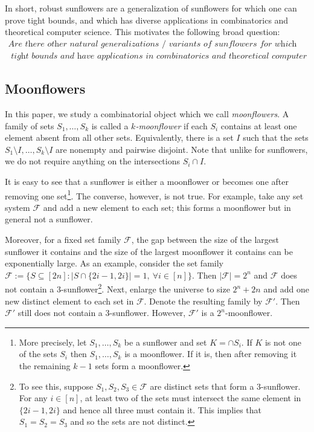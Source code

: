 \documentclass{article}
\newcommand{\<}{\langle}
\renewcommand{\>}{\rangle}
\newcommand{\calF}{\mathcal{F}}
\begin{document}
In short, robust sunflowers are a generalization of sunflowers for which one can prove tight bounds, and which has diverse applications in combinatorics and theoretical computer science. This motivates the following broad question:
\[
\begin{array}{c} %
\textit{Are there other natural generalizations / variants of sunflowers for which we are able to prove} \\
\textit{ tight bounds and have applications in combinatorics and theoretical computer science?}
\end{array}
\]

\subsection{Moonflowers}
In this paper, we study a combinatorial object which we call \emph{moonflowers}. A family of sets $S_1,\ldots,S_k$ is called a \emph{$k$-moonflower} if each $S_i$ contains at least one element absent from all other sets. Equivalently, there is a set $I$ such that the sets $S_1 \setminus I,\ldots,S_k \setminus I$ are nonempty and pairwise disjoint. Note that unlike for sunflowers, we do not require anything on the intersections $S_i \cap I$.

It is easy to see that a sunflower is either a moonflower or becomes one after removing one set\footnote{More precisely, let $S_1,\ldots,S_k$ be a sunflower and set $K= \cap S_i$. If $K$ is not one of the sets $S_i$ then $S_1,\ldots,S_k$ is a moonflower. If it is, then after removing it the remaining $k-1$ sets form a moonflower.}.
The converse, however, is not true. For example, take any set system $\calF$ and add a new element to each set; this forms a moonflower but in general not a sunflower. 

Moreover, for a fixed set family $\calF$, the gap between the size of the largest sunflower it contains and the size of the largest moonflower it contains can be exponentially large. 
As an example, consider the set family $\calF:= \{S \subseteq [2n]: |S \cap \{2i-1, 2i\}| = 1, \  \forall i\in [n]\}$. Then $|\calF| = 2^n$ and $\calF$ does not contain a $3$-sunflower\footnote{To see this, suppose $S_1, S_2, S_3 \in \calF$ are distinct sets that form a $3$-sunflower. For any $i \in [n]$, at least two of the sets must intersect the same element in $\{2i-1,2i\}$ and hence all three must contain it. This implies that $S_1=S_2=S_3$ and so the sets are not distinct.}. Next, enlarge the universe to size $2^n + 2n$ and add one new distinct element to each set in $\calF$. Denote the resulting family by $\calF'$. Then $\calF'$ still does not contain a $3$-sunflower. However, $\calF'$ is a $2^n$-moonflower.
\end{document}
